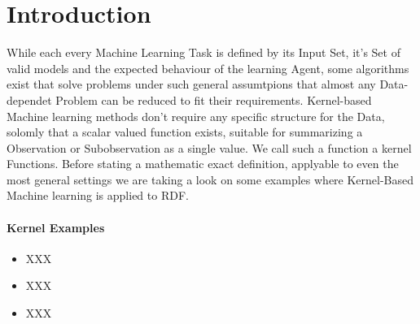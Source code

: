 
\section{Introduction}
While each every Machine Learning Task is defined by its Input Set, it's Set of valid models and the expected behaviour of the learning Agent, some algorithms exist that solve problems under such general assumtpions that almost any Data-dependet Problem can be reduced to fit their requirements. Kernel-based Machine learning methods don't require any specific structure for the Data, solomly that a scalar valued function exists, suitable for summarizing a Observation or Subobservation as a single value. We call such a function a kernel Functions. Before stating a mathematic exact definition, applyable to even the most general settings we are taking a look on some examples where Kernel-Based Machine learning is applied to RDF. 

\paragraph{Kernel Examples}
\begin{itemize}
\item XXX
\item XXX
\item XXX
\end{itemize}


